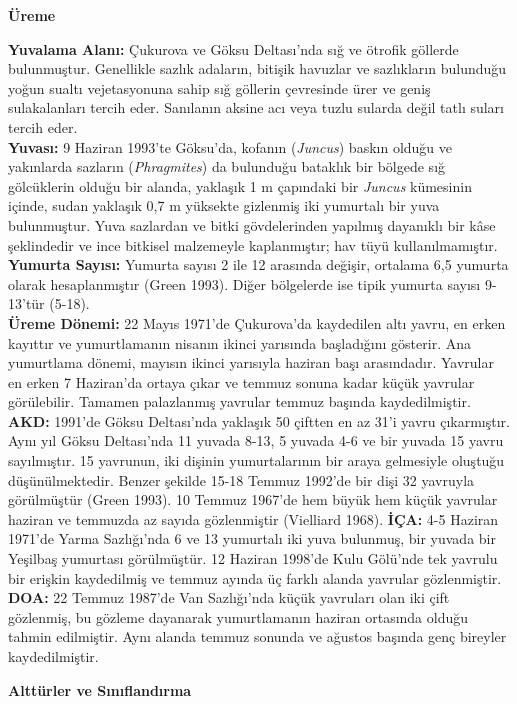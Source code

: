 \documentclass[
  letterpaper,
  DIV=11,
  numbers=noendperiod]{scrreprt}
\begin{document}
\textbf{Üreme}

\textbf{Yuvalama Alanı:} Çukurova ve Göksu Deltası'nda sığ ve ötrofik
göllerde bulunmuştur. Genellikle sazlık adaların, bitişik havuzlar ve
sazlıkların bulunduğu yoğun sualtı vejetasyonuna sahip sığ göllerin
çevresinde ürer ve geniş sulakalanları tercih eder. Sanılanın aksine acı
veya tuzlu sularda değil tatlı suları tercih eder.\\
\textbf{Yuvası:} 9 Haziran 1993'te Göksu'da, kofanın (\emph{Juncus})
baskın olduğu ve yakınlarda sazların (\emph{Phragmites}) da bulunduğu
bataklık bir bölgede sığ gölcüklerin olduğu bir alanda, yaklaşık 1 m
çapındaki bir \emph{Juncus} kümesinin içinde, sudan yaklaşık 0,7 m
yüksekte gizlenmiş iki yumurtalı bir yuva bulunmuştur. Yuva sazlardan ve
bitki gövdelerinden yapılmış dayanıklı bir kâse şeklindedir ve ince
bitkisel malzemeyle kaplanmıştır; hav tüyü kullanılmamıştır.\\
\textbf{Yumurta Sayısı:} Yumurta sayısı 2 ile 12 arasında değişir,
ortalama 6,5 yumurta olarak hesaplanmıştır (Green 1993). Diğer
bölgelerde ise tipik yumurta sayısı 9-13'tür (5-18).\\
\textbf{Üreme Dönemi:} 22 Mayıs 1971'de Çukurova'da kaydedilen altı
yavru, en erken kayıttır ve yumurtlamanın nisanın ikinci yarısında
başladığını gösterir. Ana yumurtlama dönemi, mayısın ikinci yarısıyla
haziran başı arasındadır. Yavrular en erken 7 Haziran'da ortaya çıkar ve
temmuz sonuna kadar küçük yavrular görülebilir. Tamamen palazlanmış
yavrular temmuz başında kaydedilmiştir. \textbf{AKD:} 1991'de Göksu
Deltası'nda yaklaşık 50 çiftten en az 31'i yavru çıkarmıştır. Aynı yıl
Göksu Deltası'nda 11 yuvada 8-13, 5 yuvada 4-6 ve bir yuvada 15 yavru
sayılmıştır. 15 yavrunun, iki dişinin yumurtalarının bir araya
gelmesiyle oluştuğu düşünülmektedir. Benzer şekilde 15-18 Temmuz 1992'de
bir dişi 32 yavruyla görülmüştür (Green 1993). 10 Temmuz 1967'de hem
büyük hem küçük yavrular haziran ve temmuzda az sayıda gözlenmiştir
(Vielliard 1968). \textbf{İÇA:} 4-5 Haziran 1971'de Yarma Sazlığı'nda 6
ve 13 yumurtalı iki yuva bulunmuş, bir yuvada bir Yeşilbaş yumurtası
görülmüştür. 12 Haziran 1998'de Kulu Gölü'nde tek yavrulu bir erişkin
kaydedilmiş ve temmuz ayında üç farklı alanda yavrular gözlenmiştir.
\textbf{DOA:} 22 Temmuz 1987'de Van Sazlığı'nda küçük yavruları olan iki
çift gözlenmiş, bu gözleme dayanarak yumurtlamanın haziran ortasında
olduğu tahmin edilmiştir. Aynı alanda temmuz sonunda ve ağustos başında
genç bireyler kaydedilmiştir.

\textbf{Alttürler ve Sınıflandırma}
\end{document}
